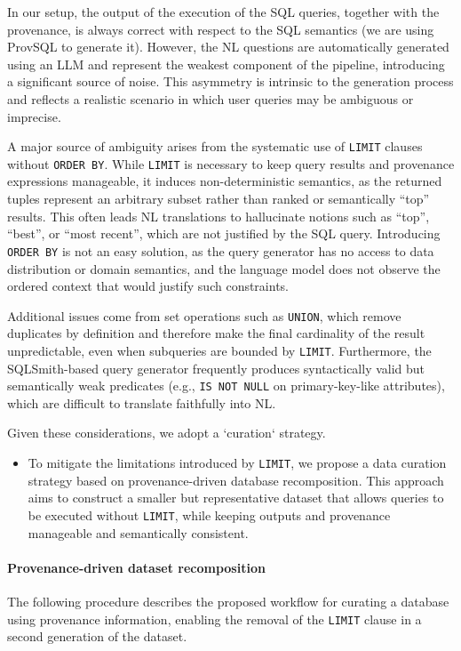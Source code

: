 \documentclass{article}
\begin{document}
In our setup, the output of the execution of the SQL queries, together with the provenance, is always correct with respect to the SQL semantics (we are using ProvSQL to generate it). 
However, the NL questions are automatically generated using an LLM and represent the weakest component of the pipeline,
introducing a significant source of noise. This asymmetry is intrinsic to the generation process and reflects a realistic scenario 
in which user queries may be ambiguous or imprecise.

A major source of ambiguity arises from the systematic use of \texttt{LIMIT} clauses without \texttt{ORDER BY}. 
While \texttt{LIMIT} is necessary to keep query results and provenance expressions manageable, it induces non-deterministic semantics, 
as the returned tuples represent an arbitrary subset rather than ranked or semantically “top” results. 
This often leads NL translations to hallucinate notions such as “top”, “best”, or “most recent”, which are not justified by the SQL query.
Introducing \texttt{ORDER BY} is not an easy solution, as the query generator has no access to data distribution or domain semantics, 
and the language model does not observe the ordered context that would justify such constraints.

Additional issues come from set operations such as \texttt{UNION}, which remove duplicates by definition and therefore make the final cardinality 
of the result unpredictable, even when subqueries are bounded by \texttt{LIMIT}. 
Furthermore, the SQLSmith-based query generator frequently produces syntactically valid but semantically weak predicates (e.g., \texttt{IS NOT NULL} 
on primary-key-like attributes), which are difficult to translate faithfully into NL.

Given these considerations, we adopt a `curation` strategy. 
\begin{itemize}
    \item To mitigate the limitations introduced by \texttt{LIMIT}, 
    we propose a data curation strategy based on provenance-driven database recomposition. 
    This approach aims to construct a smaller but representative dataset that allows queries to be executed without \texttt{LIMIT}, 
    while keeping outputs and provenance manageable and semantically consistent.
\end{itemize}
\paragraph{Provenance-driven dataset recomposition}
The following procedure describes the proposed workflow for curating a database using provenance information, enabling the removal of the \texttt{LIMIT} clause
in a second generation of the dataset.
\end{document}
